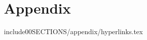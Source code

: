 
\newpage
\setcounter{secnumdepth}{0}
\section{Appendix}

include{00SECTIONS/appendix/hyperlinks.tex}
